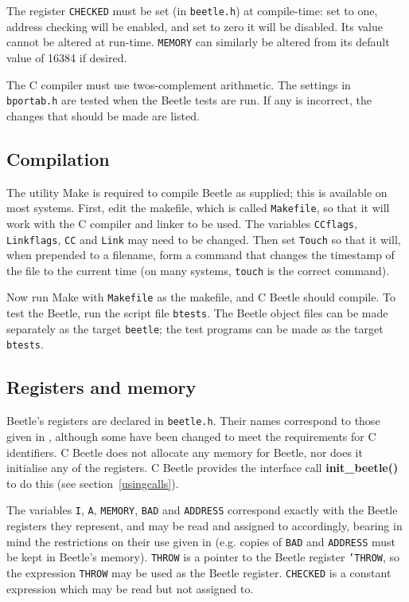 The register {\tt CHECKED} must be set (in {\tt beetle.h}) at compile-time:
set to one, address checking will be enabled, and set to zero it will be
disabled. Its value cannot be altered at run-time. {\tt MEMORY} can similarly
be altered from its default value of 16384 if desired.

The C compiler must use twos-complement arithmetic. The settings in {\tt
bportab.h} are tested when the Beetle tests are run. If any is incorrect, the
changes that should be made are listed.


\subsection{Compilation}

The utility Make is required to compile Beetle as supplied; this is available
on most systems. First, edit the makefile, which is called {\tt Makefile}, so
that it will work with the C compiler and linker to be used. The variables
{\tt CCflags}, {\tt Linkflags}, {\tt CC} and {\tt Link} may need to be
changed. Then set {\tt Touch} so that it will, when prepended to a filename,
form a command that changes the timestamp of the file to the current time (on
many systems, {\tt touch} is the correct command).

Now run Make with {\tt Makefile} as the makefile, and C Beetle should
compile. To test the Beetle, run the script file {\tt btests}. The Beetle
object files can be made separately as the target {\tt beetle}; the test
programs can be made as the target {\tt btests}.


\subsection{Registers and memory}

Beetle's registers are declared in {\tt beetle.h}. Their names correspond to
those given in \cite[section~A.2.1]{beetledis}, although some have been changed
to meet the requirements for C identifiers. C Beetle does not allocate any
memory for Beetle, nor does it initialise any of the registers. C Beetle
provides the interface call {\bf init\_beetle()} to do this (see
section~\ref{usingcalls}).

The variables {\tt I}, {\tt A}, {\tt MEMORY}, {\tt BAD} and {\tt ADDRESS}
correspond exactly with the Beetle registers they represent, and may be read
and assigned to accordingly, bearing in mind the restrictions on their use
given in \cite{beetledis} (e.g. copies of {\tt BAD} and {\tt ADDRESS} must be
kept in Beetle's memory). {\tt THROW} is a pointer to the Beetle register
{\tt 'THROW}, so the expression {\tt *THROW} may be used as the Beetle
register. {\tt CHECKED} is a constant expression which may be read but not
assigned to.

